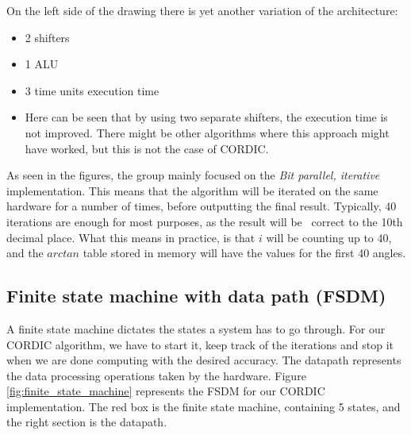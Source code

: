 \documentclass[12pt, a4paper,oneside]{article}
\begin{document}
On the left side of the drawing there is yet another variation of the architecture:

\begin{itemize}
	\item 2 shifters
	\item 1 ALU
	\item 3 time units execution time
	\item Here can be seen that by using two separate shifters, the execution time
	is not improved. There might be other algorithms where this approach might have worked,
	but this is not the case of CORDIC.
\end{itemize}

As seen in the figures, the group mainly focused on the \textit{Bit parallel,
iterative} implementation. This means that the algorithm will be iterated on 
the same hardware for a number of times, before outputting the final result.
Typically, 40 iterations are enough for most purposes, as the result will be \
correct to the 10th decimal place\cite{cordic2}. What this means in practice,
is that $i$ will be counting up to 40, and the $arctan$ table stored in memory
will have the values for the first 40 angles.

\subsection{Finite state machine with data path (FSDM)}\label{ssec:fsdm}
A finite state machine dictates the states a system has to go through.
For our CORDIC algorithm, we have to start it, keep track of the iterations
and stop it when we are done computing with the desired accuracy. 
The datapath represents the data processing operations taken by the hardware.
Figure \ref{fig:finite_state_machine} represents the FSDM for our CORDIC
implementation. The red box is the finite state machine, containing 5 states,
and the right section is the datapath. 
\end{document}
